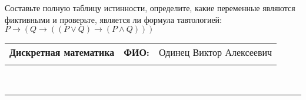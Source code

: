 \documentclass[10pt]{exam}
\newcommand{\class}{Дискретная математика}
\newcommand{\examdate}{}
\begin{document}
\begin{questions}
\begin{enumerate}[a)]
\end{enumerate}\question Составьте полную таблицу истинности, определите, какие переменные являются фиктивными и проверьте, является ли формула тавтологией:
$ P \rightarrow (Q \rightarrow ((P \lor Q) \rightarrow (P \land Q)))$

\end{questions}
\newpage
\begin{flushright}
\begin{tabular}{p{2.8in} r l}
\textbf{\class} & \textbf{ФИО:} &Одинец Виктор Алексеевич
\\

\textbf{\examdate} &&\\
\end{tabular}\\
\end{flushright}
\rule[1ex]{\textwidth}{.1pt}
\end{document}
